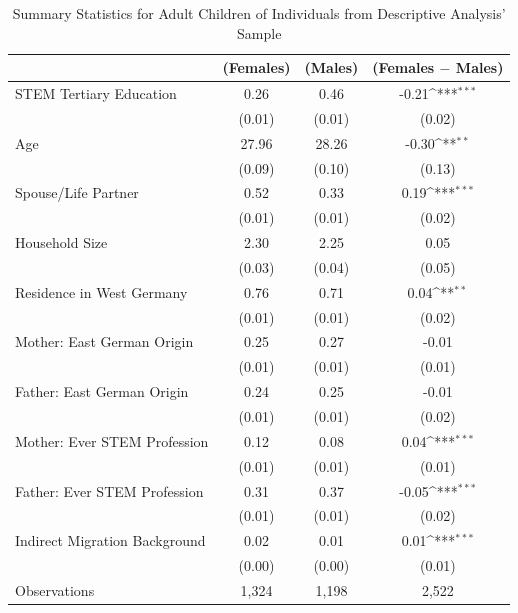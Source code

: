 \documentclass[a4paper, oneside, hyperfootnotes = false]{article}
\def\sym#1{\ifmmode^{#1}\else\(^{#1}\)\fi}
\begin{document}
{\begin{table}[ht]
	\caption[Summary Statistics for Adult Children]{Summary Statistics for Adult Children of Individuals from Descriptive Analysis' Sample}
	\label{tab:descr_summary_epid}
	\begin{center}
		\begin{tabular}{l*{3}{c}}
			\toprule
			& (Females) & (Males) & (Females $-$ Males) \\
			\midrule
			STEM Tertiary Education &  0.26 & 0.46 &   -0.21\sym{***}    \\
			&   (0.01)  & (0.01) & (0.02) \\
			\addlinespace
			Age         &   27.96   &  28.26   &   -0.30\sym{**}     \\
			&     (0.09) &        (0.10)         &      (0.13) \\
			\addlinespace
			Spouse/Life Partner &   0.52     &   0.33  &    0.19\sym{***}     \\
			&      (0.01)&          (0.01)&         (0.02) \\
			\addlinespace
			Household Size      &  2.30   &  2.25   &   0.05        \\
			&          (0.03)&       (0.04)   &   (0.05) \\
			\addlinespace
			Residence in West Germany  &  0.76   &  0.71   &     0.04\sym{**}     \\
			&         (0.01) &       (0.01)&  (0.02)\\
			\addlinespace
			Mother: East German Origin &  0.25   & 0.27    &    -0.01      \\
			&         (0.01) &       (0.01)&  (0.01)\\
			\addlinespace
			Father: East German Origin &  0.24   & 0.25    &   -0.01       \\
			&         (0.01) &       (0.01)&  (0.02)\\
			\addlinespace
			Mother: Ever STEM Profession &  0.12   & 0.08    &  0.04\sym{***}        \\
			&         (0.01) &       (0.01) &  (0.01) \\
			\addlinespace
			Father: Ever STEM Profession &  0.31   &  0.37   &   -0.05\sym{***}       \\
			&         (0.01) &       (0.01)&  (0.02)\\
			\addlinespace
			Indirect Migration Background &  0.02   &   0.01  &   0.01\sym{***}       \\
			&         (0.00) &       (0.00)&  (0.01) \\
			\midrule
			Observations        &  1,324     &  1,198     &        2,522            \\
			\bottomrule
		\end{tabular}
		

\end{center}
\end{table}}
\end{document}
